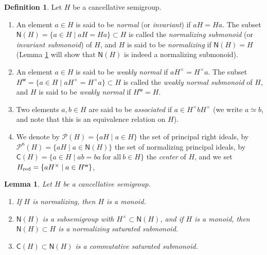 \documentclass[a4paper]{amsart}
\newtheorem{lemma}[theorem]{Lemma}
\theoremstyle{definition}
\newtheorem{definition}[theorem]{Definition}
\numberwithin{equation}{section}
\begin{document}
\medskip
\begin{definition} \label{4.2}
Let $H$ be a cancellative semigroup.
\begin{enumerate}
\item  An element $a \in H$ is said to be {\it normal} (or {\it invariant}) if $aH = Ha$. The subset $\mathsf N (H) = \{ a \in H \mid  aH = Ha \} \subset H$ is called the {\it normalizing submonoid} (or {\it invariant submonoid}) of $H$,
       and $H$ is said to be {\it normalizing} if $\mathsf N (H) =
       H$ (Lemma \ref{4.3} will show that $\mathsf N (H)$ is indeed a normalizing submonoid).

\smallskip
\item An element $a \in H$ is said to be {\it weakly normal} if $aH^{\times} = H^{\times}a$. The subset $H^{\mathsf w} = \{ a \in H \mid aH^{\times} = H^{\times}a \} \subset H$ is called the {\it weakly normal submonoid} of $H$, and $H$ is said to be {\it weakly normal} if $H^{\mathsf w} = H$.

\smallskip
\item  Two elements $a, b \in H$ are said to be {\it associated} if $a \in H^{\times} b H^{\times}$ (we write $a \simeq b$, and note that this is an equivalence relation on $H$).

\smallskip
\item We denote  by $\mathcal P (H) = \{aH \mid a \in H\}$ the set of principal right ideals,  by $\mathcal P^{\mathsf n} (H) =
      \{ aH \mid a \in \mathsf N (H)\}$ the set of normalizing
      principal ideals, by $\mathsf C (H) = \{ a \in H \mid ab = ba \ \text{for all} \ b \in H\}$ the {\it center} of $H$, and we set  $H_{{\text{\rm red}}} = \{ aH^{\times} \mid a \in H^{\mathsf w} \}$,
\end{enumerate}
\end{definition}

\medskip
\begin{lemma} \label{4.3}
Let $H$ be a cancellative semigroup.
\begin{enumerate}
\item If $H$ is normalizing, then $H$ is a monoid.

\smallskip
\item $\mathsf N (H)$ is a subsemigroup with $H^{\times} \subset \mathsf N (H)$, and if $H$ is a monoid, then $\mathsf N (H)
      \subset H$ is a normalizing saturated submonoid.

\smallskip
\item $\mathsf C (H) \subset \mathsf N (H)$ is a commutative saturated submonoid.
\end{enumerate}
\end{lemma}
\end{document}

